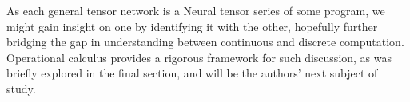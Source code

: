 \documentclass[smallcondensed]{svjour3}
\begin{document}
As each general tensor network is a Neural tensor series of some program, we might gain insight on one by identifying it with the other,
hopefully further bridging the gap in understanding between continuous and discrete computation.
 Operational calculus provides a rigorous framework for such discussion, as was briefly explored in the final section, and will be the authors' next subject of study.


\end{document}
